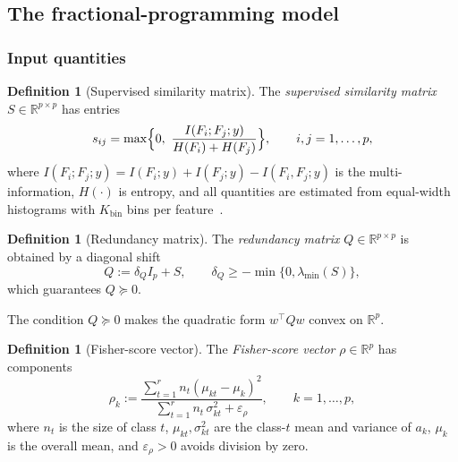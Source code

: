 \documentclass[]{interact}
\theoremstyle{plain}
\theoremstyle{definition}
\newtheorem{definition}[theorem]{Definition}
\theoremstyle{remark}
\newcommand{\R}{\mathbb{R}}
\begin{document}
\subsection{The fractional-programming model}\label{ssec:wang}
\subsubsection{Input quantities}\label{sssec:wang-inputs}
\begin{definition}[Supervised similarity matrix]\label{def:sim-mi}
The \emph{supervised similarity matrix} $S\in\R^{p\times p}$ has entries
\begin{equation}\label{eq:simMI}
s_{ij}=\max\Bigl\{0,\ \frac{I(F_i;F_j;y)}{H(F_i)+H(F_j)}\Bigr\},\qquad i,j=1,\dots,p,
\end{equation}
where $I(F_i;F_j;y)=I(F_i;y)+I(F_j;y)-I(F_i,F_j;y)$ is the multi-information, $H(\cdot)$ is entropy, and all quantities are estimated from equal-width histograms with $K_{\mathrm{bin}}$ bins per feature~\citep{brown2012}.
\end{definition}
\begin{definition}[Redundancy matrix]\label{def:Q}
The \emph{redundancy matrix} $Q\in\R^{p\times p}$ is obtained by a diagonal shift
\begin{equation}\label{eq:matrixQ}
Q:=\delta_Q I_p+S,\qquad \delta_Q\ge-\min\{0,\lambda_{\min}(S)\},
\end{equation}
which guarantees $Q\succeq 0$.
\end{definition}
The condition $Q\succeq0$ makes the quadratic form $w^{\top}Qw$ convex on $\R^p$.
\begin{definition}[Fisher-score vector]\label{def:fisher}
The \emph{Fisher-score vector} $\rho\in\R^p$ has components
\begin{equation}\label{eq:rhoFisher}
\rho_k:=\frac{\sum_{t=1}^r n_t(\mu_{kt}-\mu_k)^2}{\sum_{t=1}^r n_t\,\sigma_{kt}^2+\varepsilon_\rho},
\qquad k=1,\dots,p,
\end{equation}
where $n_t$ is the size of class $t$, $\mu_{kt},\sigma_{kt}^2$ are the class-$t$ mean and variance of $a_k$, $\mu_k$ is the overall mean, and $\varepsilon_\rho>0$ avoids division by zero.
\end{definition}
\end{document}
